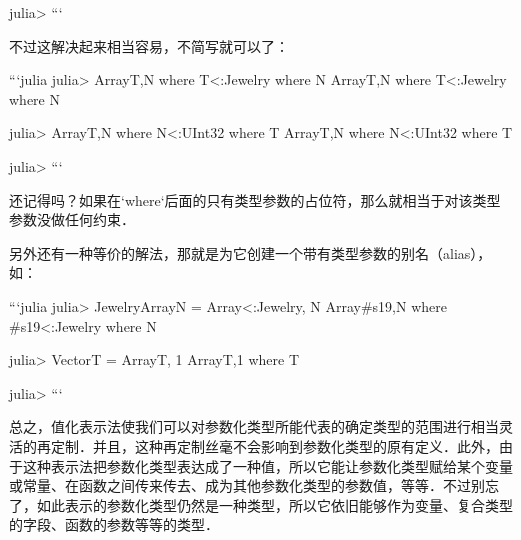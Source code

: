 julia>  
```

不过这解决起来相当容易，不简写就可以了：

```julia
julia> Array{T,N} where T<:Jewelry where N
Array{T,N} where T<:Jewelry where N

julia> Array{T,N} where N<:UInt32 where T
Array{T,N} where N<:UInt32 where T

julia> 
```

还记得吗？如果在`where`后面的只有类型参数的占位符，那么就相当于对该类型参数没做任何约束．

另外还有一种等价的解法，那就是为它创建一个带有类型参数的别名（alias），如：

```julia
julia> JewelryArray{N} = Array{<:Jewelry, N}
Array{#s19,N} where #s19<:Jewelry where N

julia> Vector{T} = Array{T, 1}
Array{T,1} where T

julia> 
```

总之，值化表示法使我们可以对参数化类型所能代表的确定类型的范围进行相当灵活的再定制．并且，这种再定制丝毫不会影响到参数化类型的原有定义．此外，由于这种表示法把参数化类型表达成了一种值，所以它能让参数化类型赋给某个变量或常量、在函数之间传来传去、成为其他参数化类型的参数值，等等．不过别忘了，如此表示的参数化类型仍然是一种类型，所以它依旧能够作为变量、复合类型的字段、函数的参数等等的类型．
